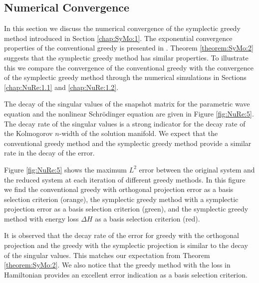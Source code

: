 \subsection{Numerical Convergence} {\edit In this section we discuss the numerical convergence of the symplectic greedy method introduced in Section \ref{chap:SyMo:1}. The exponential convergence properties of the conventional greedy \cite{Quarteroni:2016wi} is presented in \cite{Buffa:2012iz,Binev:2011fj}. Theorem \ref{theorem:SyMo:2} suggests that the symplectic greedy method has similar properties. To illustrate this we compare the convergence of the conventional greedy with the convergence of the symplectic greedy method through the numerical simulations in Sections \ref{chap:NuRe:1.1} and \ref{chap:NuRe:1.2}. 

The decay of the singular values of the snapshot matrix for the parametric wave equation and the nonlinear Schr\"odinger equation are given in Figure \ref{fig:NuRe:5}. The decay rate of the singular values is a strong indicator for the decay rate of the Kolmogorov $n$-width of the solution manifold. We expect that the conventional greedy method and the symplectic greedy method provide a similar rate in the decay of the error.
	
Figure \ref{fig:NuRe:5} shows the maximum $L^2$ error between the original system and the reduced system at each iteration of different greedy methods. In this figure we find the conventional greedy with orthogonal projection error as a basis selection criterion (orange), the symplectic greedy method with a symplectic projection error as a basis selection criterion (green), and the symplectic greedy method with energy loss $\Delta H$ as a basis selection criterion (red).

It is observed that the decay rate of the error for greedy with the orthogonal projection and the greedy with the symplectic projection is similar to the decay of the singular values. This matches our expectation from Theorem \ref{theorem:SyMo:2}. We also notice that the greedy method with the loss in Hamiltonian provides an excellent error indication as a basis selection criterion.
}


